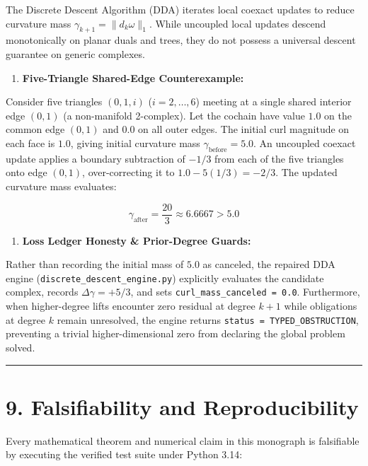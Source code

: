 \documentclass[11pt]{article}
\begin{document}
The Discrete Descent Algorithm (DDA) iterates local coexact updates to reduce curvature mass $\gamma_{k+1} = \|d_k \omega\|_1$. While uncoupled local updates descend monotonically on planar duals and trees, they do not possess a universal descent guarantee on generic complexes.

\begin{enumerate}[leftmargin=1.4em,itemsep=0.2em]
\item \textbf{Five-Triangle Shared-Edge Counterexample:}
\end{enumerate}
Consider five triangles $(0, 1, i)$ ($i = 2, \dots, 6$) meeting at a single shared interior edge $(0, 1)$ (a non-manifold 2-complex). Let the cochain have value $1.0$ on the common edge $(0, 1)$ and $0.0$ on all outer edges. The initial curl magnitude on each face is $1.0$, giving initial curvature mass $\gamma_{\mathrm{before}} = 5.0$. An uncoupled coexact update applies a boundary subtraction of $-1/3$ from each of the five triangles onto edge $(0, 1)$, over-correcting it to $1.0 - 5(1/3) = -2/3$. The updated curvature mass evaluates:

\begin{equation*}
   \gamma_{\mathrm{after}} = \frac{20}{3} \approx 6.6667 > 5.0
\end{equation*}

\begin{enumerate}[leftmargin=1.4em,itemsep=0.2em]
\item \textbf{Loss Ledger Honesty \& Prior-Degree Guards:}
\end{enumerate}
Rather than recording the initial mass of $5.0$ as canceled, the repaired DDA engine (\texttt{discrete\_descent\_engine.py}) explicitly evaluates the candidate complex, records $\Delta \gamma = +5/3$, and sets \texttt{curl\_mass\_canceled = 0.0}. Furthermore, when higher-degree lifts encounter zero residual at degree $k+1$ while obligations at degree $k$ remain unresolved, the engine returns \texttt{status = TYPED\_OBSTRUCTION}, preventing a trivial higher-dimensional zero from declaring the global problem solved.

\medskip\hrule\medskip
\section{\texorpdfstring{9. Falsifiability and Reproducibility}{9. Falsifiability and Reproducibility}}

Every mathematical theorem and numerical claim in this monograph is falsifiable by executing the verified test suite under Python 3.14:
\end{document}

